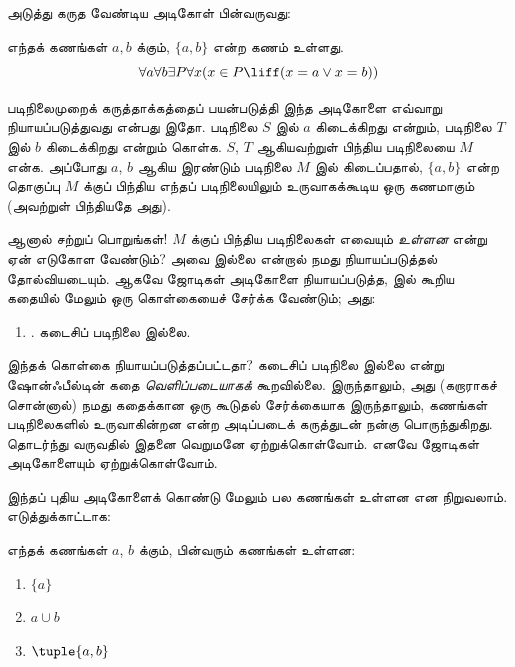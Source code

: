 \documentclass[../../../include/open-logic-section]{subfiles}
\begin{document}

அடுத்து கருத வேண்டிய அடிகோள் பின்வருவது:

\begin{axiom}[ஜோடிகள்]
எந்தக் கணங்கள் $a, b$ க்கும், $\{a, b\}$ என்ற கணம் உள்ளது.
\[
	\forall a \forall b \exists P \forall x (x \in P \liff (x = a \lor x = b))
\]
\end{axiom}

படிநிலைமுறைக் கருத்தாக்கத்தைப் பயன்படுத்தி இந்த அடிகோளை எவ்வாறு
நியாயப்படுத்துவது என்பது இதோ. படிநிலை $S$ இல் $a$ கிடைக்கிறது என்றும்,
படிநிலை $T$ இல் $b$ கிடைக்கிறது என்றும் கொள்க. $S$, $T$ ஆகியவற்றுள்
பிந்திய படிநிலையை $M$ என்க. அப்போது $a$, $b$ ஆகிய இரண்டும் படிநிலை $M$
இல் கிடைப்பதால், $\{a,b\}$ என்ற தொகுப்பு $M$ க்குப் பிந்திய எந்தப்
படிநிலையிலும் உருவாகக்கூடிய ஒரு கணமாகும் (அவற்றுள் பிந்தியதே அது).

ஆனால் சற்றுப் பொறுங்கள்!{} $M$ க்குப் பிந்திய படிநிலைகள் எவையும்
\emph{உள்ளன} என்று ஏன் எடுகோள வேண்டும்? அவை இல்லை என்றால் நமது
நியாயப்படுத்தல் தோல்வியடையும். ஆகவே ஜோடிகள் அடிகோளை நியாயப்படுத்த,
 இல் கூறிய கதையில் மேலும் ஒரு கொள்கையைச்
சேர்க்க வேண்டும்; அது:
\begin{enumerate}
	\item[] \stagessucc. கடைசிப் படிநிலை இல்லை.
\end{enumerate}
இந்தக் கொள்கை நியாயப்படுத்தப்பட்டதா? கடைசிப் படிநிலை இல்லை என்று
ஷோன்ஃபீல்டின் கதை \emph{வெளிப்படையாகக்} கூறவில்லை. இருந்தாலும், அது
(கறாராகச் சொன்னால்) நமது கதைக்கான ஒரு கூடுதல் சேர்க்கையாக
இருந்தாலும், கணங்கள் படிநிலைகளில் உருவாகின்றன என்ற அடிப்படைக் கருத்துடன்
நன்கு பொருந்துகிறது. தொடர்ந்து வருவதில் இதனை வெறுமனே ஏற்றுக்கொள்வோம்.
எனவே ஜோடிகள் அடிகோளையும் ஏற்றுக்கொள்வோம்.

இந்தப் புதிய அடிகோளைக் கொண்டு மேலும் பல கணங்கள் உள்ளன என நிறுவலாம்.
எடுத்துக்காட்டாக:

\begin{prop}
எந்தக் கணங்கள் $a$, $b$ க்கும், பின்வரும் கணங்கள் உள்ளன:
	\begin{enumerate}
		\item{} $\{a\}$
		\item{} $a \cup b$
		\item{} $\tuple{a, b}$
	\end{enumerate}
\end{prop}
\end{document}
